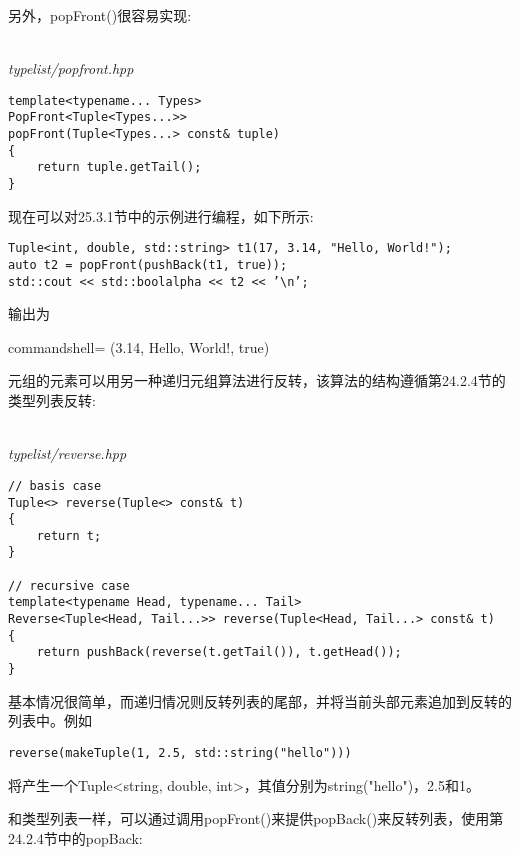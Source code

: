 另外，popFront()很容易实现:

\hspace*{\fill} \\ %
\noindent
\textit{typelist/popfront.hpp}
\begin{lstlisting}[style=styleCXX]
template<typename... Types>
PopFront<Tuple<Types...>>
popFront(Tuple<Types...> const& tuple)
{
	return tuple.getTail();
}
\end{lstlisting}

现在可以对25.3.1节中的示例进行编程，如下所示:

\begin{lstlisting}[style=styleCXX]
Tuple<int, double, std::string> t1(17, 3.14, "Hello, World!");
auto t2 = popFront(pushBack(t1, true));
std::cout << std::boolalpha << t2 << ’\n’;
\end{lstlisting}

输出为

\begin{tcblisting}{commandshell={}}
(3.14, Hello, World!, true)
\end{tcblisting}


元组的元素可以用另一种递归元组算法进行反转，该算法的结构遵循第24.2.4节的类型列表反转:

\hspace*{\fill} \\ %
\noindent
\textit{typelist/reverse.hpp}
\begin{lstlisting}[style=styleCXX]
// basis case
Tuple<> reverse(Tuple<> const& t)
{
	return t;
}

// recursive case
template<typename Head, typename... Tail>
Reverse<Tuple<Head, Tail...>> reverse(Tuple<Head, Tail...> const& t)
{
	return pushBack(reverse(t.getTail()), t.getHead());
}
\end{lstlisting}

基本情况很简单，而递归情况则反转列表的尾部，并将当前头部元素追加到反转的列表中。例如

\begin{lstlisting}[style=styleCXX]
reverse(makeTuple(1, 2.5, std::string("hello")))
\end{lstlisting}

将产生一个Tuple<string, double, int>，其值分别为string("hello")，2.5和1。

和类型列表一样，可以通过调用popFront()来提供popBack()来反转列表，使用第24.2.4节中的popBack:


